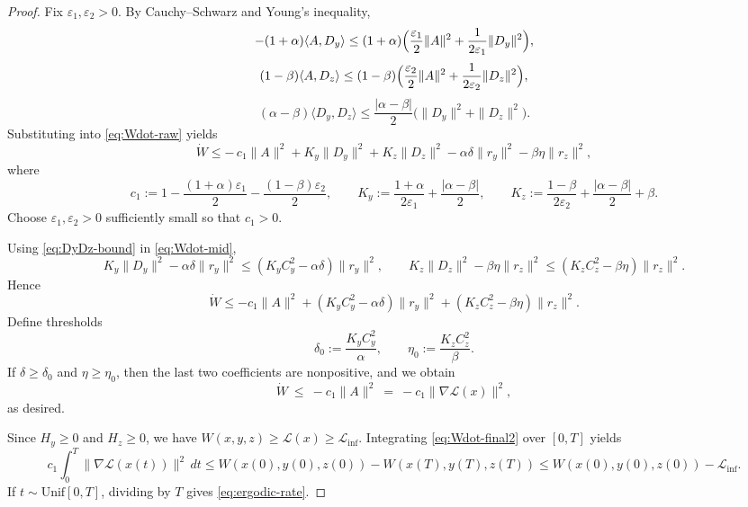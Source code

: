 \documentclass{article}
\newcommand{\1}{\mathbf{1}}
\begin{document}
\begin{proof}
\medskip
\noindent Fix $\varepsilon_1,\varepsilon_2>0$. By Cauchy--Schwarz and Young's inequality,
\[
-(1+\alpha)\langle A,D_y\rangle
\le (1+\alpha)\Bigl(\frac{\varepsilon_1}{2}\|A\|^2+\frac{1}{2\varepsilon_1}\|D_y\|^2\Bigr),
\]
\[
(1-\beta)\langle A,D_z\rangle
\le (1-\beta)\Bigl(\frac{\varepsilon_2}{2}\|A\|^2+\frac{1}{2\varepsilon_2}\|D_z\|^2\Bigr),
\]
\[
(\alpha-\beta)\langle D_y,D_z\rangle
\le \frac{|\alpha-\beta|}{2}\bigl(\|D_y\|^2+\|D_z\|^2\bigr).
\]
Substituting into \eqref{eq:Wdot-raw} yields
\begin{equation}\label{eq:Wdot-mid}
\dot W
\le
-\,c_1\|A\|^2
+K_y\|D_y\|^2
+K_z\|D_z\|^2
-\alpha\delta\|r_y\|^2
-\beta\eta\|r_z\|^2,
\end{equation}
where
\[
c_1:=1-\frac{(1+\alpha)\varepsilon_1}{2}-\frac{(1-\beta)\varepsilon_2}{2},
\qquad
K_y:=\frac{1+\alpha}{2\varepsilon_1}+\frac{|\alpha-\beta|}{2},
\qquad
K_z:=\frac{1-\beta}{2\varepsilon_2}+\frac{|\alpha-\beta|}{2}+\beta.
\]
Choose $\varepsilon_1,\varepsilon_2>0$ sufficiently small so that $c_1>0$.



\medskip
\noindent Using \eqref{eq:DyDz-bound} in \eqref{eq:Wdot-mid},
\[
K_y\|D_y\|^2-\alpha\delta\|r_y\|^2
\le (K_yC_y^2-\alpha\delta)\|r_y\|^2,
\qquad
K_z\|D_z\|^2-\beta\eta\|r_z\|^2
\le (K_zC_z^2-\beta\eta)\|r_z\|^2.
\]
Hence
\[
\dot W
\le -c_1\|A\|^2 + (K_yC_y^2-\alpha\delta)\|r_y\|^2 + (K_zC_z^2-\beta\eta)\|r_z\|^2.
\]
Define thresholds
\[
\delta_0:=\frac{K_yC_y^2}{\alpha},
\qquad
\eta_0:=\frac{K_zC_z^2}{\beta}.
\]
If $\delta\ge \delta_0$ and $\eta\ge \eta_0$, then the last two coefficients are nonpositive, and we obtain
\begin{equation}\label{eq:Wdot-final2}
\dot W \ \le\ -c_1\|A\|^2 \ =\ -c_1\|\nabla\mathcal L(x)\|^2,
\end{equation}
as desired.

\medskip
\noindent Since $H_y\ge 0$ and $H_z\ge 0$, we have $W(x,y,z)\ge \mathcal L(x)\ge \mathcal L_{\inf}$.
Integrating \eqref{eq:Wdot-final2} over $[0,T]$ yields
\[
c_1\int_0^T \|\nabla \mathcal L(x(t))\|^2\,dt
\le W(x(0),y(0),z(0)) - W(x(T),y(T),z(T))
\le W(x(0),y(0),z(0))-\mathcal L_{\inf}.
\]
If $t\sim\mathrm{Unif}[0,T]$, dividing by $T$ gives \eqref{eq:ergodic-rate}.
\end{proof}
\end{document}
